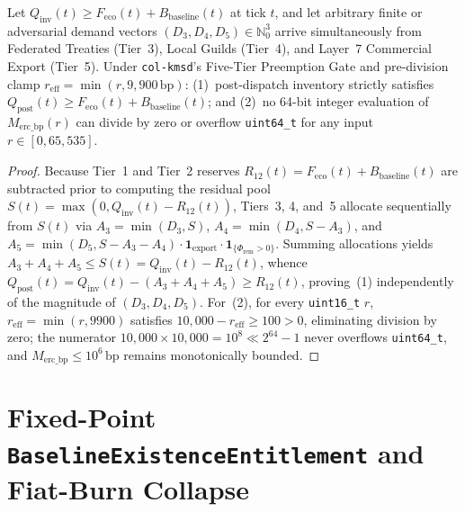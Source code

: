 \begin{theorem}
\label{thm:ch6-survival-invariance}
Let $Q_{\mathrm{inv}}(t) \ge F_{\mathrm{eco}}(t) + B_{\mathrm{baseline}}(t)$ at tick $t$, and let
arbitrary finite or adversarial demand vectors $(D_3, D_4, D_5) \in \mathbb{N}_0^3$ arrive
simultaneously from Federated Treaties (Tier~3), Local Guilds (Tier~4), and Layer~7 Commercial
Export (Tier~5). Under \texttt{col-kmsd}'s Five-Tier Preemption Gate and pre-division clamp
$r_{\mathrm{eff}} = \min(r, 9{,}900\,\mathrm{bp})$: (1)~post-dispatch inventory strictly satisfies
$Q_{\mathrm{post}}(t) \ge F_{\mathrm{eco}}(t) + B_{\mathrm{baseline}}(t)$; and (2)~no 64-bit integer
evaluation of $M_{\mathrm{erc\_bp}}(r)$ can divide by zero or overflow \texttt{uint64\_t} for any
input $r \in [0, 65{,}535]$.
\end{theorem}
\begin{proof}
Because Tier~1 and Tier~2 reserves $R_{12}(t) = F_{\mathrm{eco}}(t) + B_{\mathrm{baseline}}(t)$ are
subtracted prior to computing the residual pool $S(t) = \max(0, Q_{\mathrm{inv}}(t) - R_{12}(t))$,
Tiers~3, 4, and~5 allocate sequentially from $S(t)$ via $A_3 = \min(D_3, S)$,
$A_4 = \min(D_4, S - A_3)$, and $A_5 = \min(D_5, S - A_3 - A_4) \cdot \mathbf{1}_{\mathrm{export}}
\cdot \mathbf{1}_{\{\Phi_{\mathrm{rem}}>0\}}$. Summing allocations yields
$A_3 + A_4 + A_5 \le S(t) = Q_{\mathrm{inv}}(t) - R_{12}(t)$, whence
$Q_{\mathrm{post}}(t) = Q_{\mathrm{inv}}(t) - (A_3 + A_4 + A_5) \ge R_{12}(t)$, proving~(1)
independently of the magnitude of $(D_3, D_4, D_5)$. For~(2), for every \texttt{uint16\_t} $r$,
$r_{\mathrm{eff}} = \min(r, 9900)$ satisfies $10{,}000 - r_{\mathrm{eff}} \ge 100 > 0$, eliminating
division by zero; the numerator $10{,}000 \times 10{,}000 = 10^8 \ll 2^{64}-1$ never overflows
\texttt{uint64\_t}, and $M_{\mathrm{erc\_bp}} \le 10^6\,\mathrm{bp}$ remains monotonically bounded.
\end{proof}

\section{Fixed-Point \texttt{BaselineExistenceEntitlement} and Fiat-Burn Collapse}
\label{sec:ch6-baseline-entitlement}

